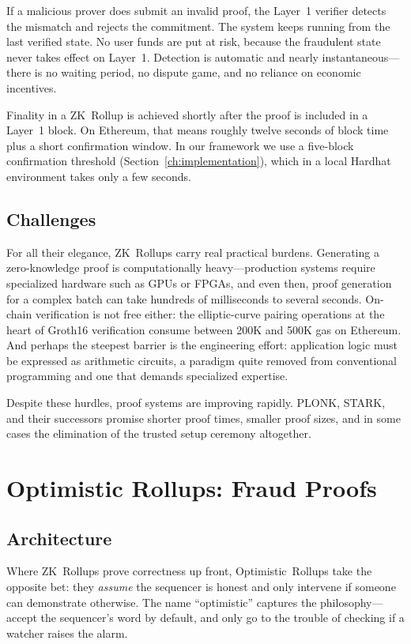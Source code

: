 If a malicious prover does submit an invalid proof, the Layer~1 verifier detects the mismatch and rejects the commitment. The system keeps running from the last verified state. No user funds are put at risk, because the fraudulent state never takes effect on Layer~1. Detection is automatic and nearly instantaneous---there is no waiting period, no dispute game, and no reliance on economic incentives.

Finality in a ZK~Rollup is achieved shortly after the proof is included in a Layer~1 block. On Ethereum, that means roughly twelve seconds of block time plus a short confirmation window. In our framework we use a five-block confirmation threshold (Section~\ref{ch:implementation}), which in a local Hardhat environment takes only a few seconds.

\subsection{Challenges}

For all their elegance, ZK~Rollups carry real practical burdens. Generating a zero-knowledge proof is computationally heavy---production systems require specialized hardware such as GPUs or FPGAs, and even then, proof generation for a complex batch can take hundreds of milliseconds to several seconds. On-chain verification is not free either: the elliptic-curve pairing operations at the heart of Groth16 verification consume between 200K and 500K gas on Ethereum. And perhaps the steepest barrier is the engineering effort: application logic must be expressed as arithmetic circuits, a paradigm quite removed from conventional programming and one that demands specialized expertise.

Despite these hurdles, proof systems are improving rapidly. PLONK, STARK, and their successors promise shorter proof times, smaller proof sizes, and in some cases the elimination of the trusted setup ceremony altogether.

\section{Optimistic Rollups: Fraud Proofs}

\subsection{Architecture}

Where ZK~Rollups prove correctness up front, Optimistic~Rollups take the opposite bet: they \textit{assume} the sequencer is honest and only intervene if someone can demonstrate otherwise. The name ``optimistic'' captures the philosophy---accept the sequencer's word by default, and only go to the trouble of checking if a watcher raises the alarm.

